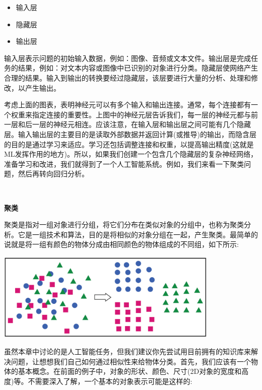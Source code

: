 \begin{itemize}
	\item 输入层
	\item 隐藏层
	\item 输出层
\end{itemize}

输入层表示问题的初始输入数据，例如：图像、音频或文本文件。输出层是完成任务的结果，例如：对文本内容或图像中已识别的对象进行分类。隐藏层使网络产生合理的结果。输入到输出的转换要经过隐藏层，该层要进行大量的分析、处理和修改，以产生输出。 \par
考虑上面的图表，表明神经元可以有多个输入和输出连接。通常，每个连接都有一个权重来指定连接的重要性。上图中的神经元层告诉我们，每一层的神经元都与前一层和后一层的神经元相连。应该注意，在输入层和输出层之间可能有几个隐藏层。输入输出层的主要目的是读取外部数据并返回计算(或推导)的输出，而隐含层的目的是通过学习来适应。学习还包括调整连接和权重，以提高输出精度(这就是ML发挥作用的地方)。所以，如果我们创建一个包含几个隐藏层的复杂神经网络，准备学习和改进，我们就得到了一个人工智能系统。例如，我们来看一下聚类问题，然后再转向回归分析。 \par

\noindent\textbf{}\ \par
\textbf{聚类} \ \par
聚类是指对一组对象进行分组，将它们分布在类似对象的分组中，也称为聚类分析。它是一组技术和算法，目的是将相似的对象分组在一起，产生聚类。最简单的说就是将一组有颜色的物体分成由相同颜色的物体组成的不同组，如下所示: \par

\begin{center}
	\includegraphics[width=0.8\textwidth]{content/Section-3/Chapter-15/11}
\end{center}

虽然本章中讨论的是人工智能任务，但我们建议你先尝试用目前拥有的知识库来解决问题，让想想我们自己如何通过相似性来给物体分类。首先，我们应该有一个物体的基本概念。在前面的例子中，对象的形状、颜色、尺寸(2D对象的宽度和高度)等。不需要深入了解，一个基本的对象表示可能是这样的: \par

